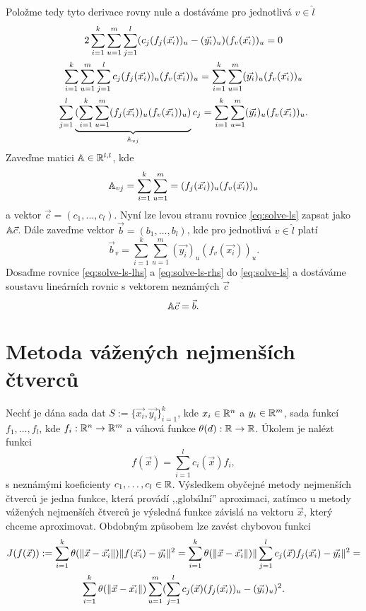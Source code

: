 Položme tedy tyto derivace rovny nule a dostáváme pro jednotlivá $v \in \hat l$
\begin{multline}
\label{eq:solve-ls}
  2\sum_{i=1}^k\sum_{u=1}^m\sum_{j=1}^l (c_j(f_j(\vec{x_i}))_u - (\vec{y_i})_u)(f_v(\vec{x_i}))_u = 0\\
  \sum_{i=1}^k\sum_{u=1}^m\sum_{j=1}^l c_j(f_j(\vec{x_i}))_u (f_v(\vec{x_i}))_u = \sum_{i=1}^k\sum_{u=1}^m(\vec{y_i})_u(f_v(\vec{x_i}))_u\\
  \sum_{j=1}^l\underbrace{(\sum_{i=1}^k\sum_{u=1}^m(f_j(\vec{x_i}))_u (f_v(\vec{x_i}))_u)}_{\mathbb{A}_{vj}}c_j = \sum_{i=1}^k\sum_{u=1}^m(\vec{y_i})_u(f_v(\vec{x_i}))_u.\\
\end{multline}
Zaveďme matici $\mathbb{A} \in \mathbb{R}^{l,l}$, kde 
\begin{equation}
\label{eq:solve-ls-lhs}
  \mathbb{A}_{vj} = \sum_{i=1}^k\sum_{u=1}^m = (f_j(\vec{x_i}))_u(f_v(\vec{x_i}))_u
\end{equation}
a vektor $\vec{c} = (c_1,\ldots,c_l)$. Nyní lze levou stranu rovnice \ref{eq:solve-ls} zapsat jako $\mathbb{A}\vec{c}$. Dále zaveďme vektor $\vec{b} = (b_1,\ldots,b_l)$, kde pro jednotlivá $v \in \hat l$ platí
\begin{equation}
\label{eq:solve-ls-rhs}
  \vec{b}_v = \sum_{i=1}^k\sum_{u=1}^m (\vec{y_i})_u (f_v(\vec{x_i}))_u.
\end{equation}
Dosaďme rovnice \ref{eq:solve-ls-lhs} a \ref{eq:solve-ls-rhs} do \ref{eq:solve-ls} a dostáváme soustavu lineárních rovnic s vektorem neznámých $\vec{c}$
\begin{equation}
  \mathbb{A}\vec{c} = \vec{b}.
\end{equation}

\section{Metoda vážených nejmenších čtverců}

Nechť je dána sada dat $S := \{\vec{x_i}, \vec{y_i}\}_{i = 1}^k$, kde $x_i \in \mathbb{R}^n$ a $y_i \in \mathbb{R}^m$, sada funkcí $f_1,\ldots,f_l$, kde $f_i: \mathbb{R}^n \rightarrow \mathbb{R}^m$ a váhová funkce $\theta(d): \mathbb{R} \rightarrow \mathbb{R}$. Úkolem je nalézt funkci
\begin{equation}
  \label{defi:wls}
  f(\vec{x}) = \sum_{i=1}^lc_i(\vec{x})f_i,
\end{equation}
s neznámými koeficienty $c_1,\ldots,c_l \in \mathbb{R}$. Výsledkem obyčejné metody nejmenších čtverců je jedna funkce, která provádí ,,globální'' aproximaci, zatímco u metody vážených nejmenších čtverců je výsledná funkce závislá na vektoru $\vec{x}$, který chceme aproximovat. Obdobným způsobem lze zavést chybovou funkci
\begin{multline}
  \label{defi:wls-min}
  J(f(\vec{x})) := \sum_{i=1}^k \theta(\|\vec{x} - \vec{x_i}\|)\|f(\vec{x_i}) - \vec{y_i}\|^2 =
  \sum_{i=1}^k\theta(\|\vec{x} - \vec{x_i}\|)\|\sum_{j=1}^l c_j(\vec{x})f_j(\vec{x_i}) - \vec{y_i}\|^2 =\\
  \sum_{i=1}^k\theta(\|\vec{x} - \vec{x_i}\|)\sum_{u=1}^m(\sum_{j=1}^l c_j(\vec{x})(f_j(\vec{x_i}))_u - (\vec{y_i})_u)^2.\\
\end{multline}

